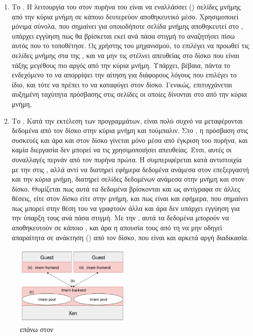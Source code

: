 \begin{enumerate}
  \item Το . Η λειτουργία του στον πυρήνα του
   είναι να εναλλάσσει () σελίδες μνήμης από την κύρια
  μνήμη σε κάποιο δευτερεύον αποθηκευτικό μέσο. Χρησιμοποιεί μόνιμα
  σύνολα, που σημαίνει για οποιοδήποτε σελίδα μνήμης αποθηκευτεί
  στο , υπάρχει εγγύηση πως θα βρίσκεται εκεί ανά πάσα
  στιγμή το αναζητήσει πίσω αυτός που το τοποθέτησε. Ως χρήστης
  του  μηχανισμού, το  επιλέγει να προωθεί τις σελίδες
  μνήμης στα  της , και να μην τις στέλνει απευθείας στο
  δίσκο που είναι τάξης μεγέθους πιο αργός από την κύρια μνήμη.
  Υπάρχει, βέβαια, πάντα το ενδεχόμενο το  να απορρίψει την
  αίτηση  για διάφορους λόγους που επιλέγει το ίδιο, και τότε
  να πρέπει το  να καταφύγει στον δίσκο. Γενικώς, επιτυγχάνεται
  αυξημένη ταχύτητα πρόσβασης στις σελίδες οι οποίες δίνονται στο 
  από την κύρια μνήμη.

  \item Το . Κατά την εκτέλεση των προγραμμάτων,
  είναι πολύ συχνό να μεταφέρονται δεδομένα από τον δίσκο στην κύρια
  μνήμη και τούμπαλιν. Στο , η πρόσβαση στις συσκευές και άρα
  και στον δίσκο γίνεται μόνο μέσα από έγκριση του πυρήνα, και καμία
  διεργασία δεν μπορεί να τις χρησιμοποιήσει απευθείας. Έτσι, αυτές οι
  συναλλαγές περνάν από τον πυρήνα πρώτα. Η  συμπεριφέρεται
  κατά αντιστοιχία με την  στις , αλλά αντί να διατηρεί εφήμερα
  δεδομένα ανάμεσα στον επεξεργαστή και την κύρια μνήμη, διατηρεί σελίδες
  δεδομένων ανάμεσα στην μνήμη και στον δίσκο. Θυμίζεται πως αυτά τα
  δεδομένα βρίσκονται και ως αντίγραφα σε άλλες θέσεις, είτε στον δίσκο
  είτε στην μνήμη, και πως είναι και εφήμερα, που σημαίνει πως μπορεί στην θέση
  του να γραφτούν άλλα και άρα δεν υπάρχει εγγύηση για την ύπαρξη τους
  ανά πάσα στιγμή. Με την , αυτά τα δεδομένα μπορούν να αποθηκευτούν
  σε κάποιο , και άρα η απουσία τους από τη  να μην
  οδηγεί απαραίτητα σε ανάκτηση () από τον δίσκο, που είναι και αρκετά
  αργή διαδικασία\cite{Aimilios}.
\end{enumerate}

\begin{figure}[h]
  \includegraphics[width=0.5\textwidth]{pictures/tmemXen.PNG}
  \caption{ επάνω στον }
  \label{fig:tmemXen}
\end{figure}






